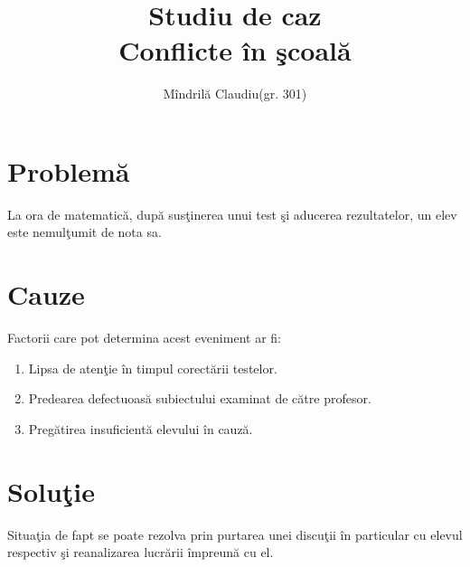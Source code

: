 \documentclass{article}
\title{\textbf{Studiu de caz } \\Conflicte \^ in \c scoal\u a \\  } %
\author{M\^indril\u a Claudiu(gr. 301)} %
\begin{document}
\maketitle %




\section{Problem\u a}
La ora de matematic\u a, dup\u a sus\c tinerea unui test \c si aducerea rezultatelor, un elev este nemul\c tumit de nota sa.


\label{definitions}

\section{Cauze}
Factorii care pot determina acest eveniment ar fi:

\begin{enumerate}

\item Lipsa de aten\c tie \^ in timpul corect\u arii testelor.
\item Predearea defectuoas\u a subiectului examinat de c\u atre profesor.
\item Preg\u atirea insuficient\u a elevului \^ in cauz\u a.


\end{enumerate}




\section{Solu\c tie}

Situa\c tia de fapt se poate rezolva prin purtarea unei discu\c tii \^ in particular cu elevul respectiv \c si reanalizarea lucr\u arii \^ impreun\u a cu el.
\end{document}
